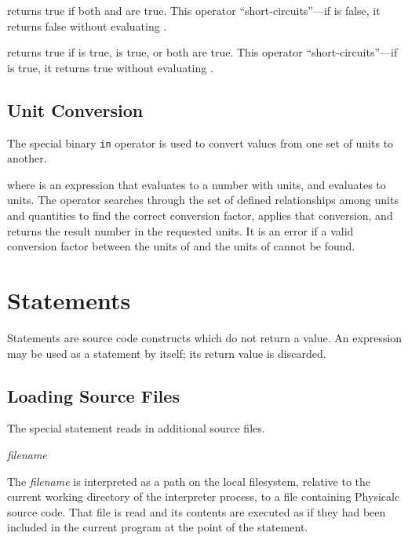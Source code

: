 \begin{syntax}
  
\end{syntax}
returns true if both  and  are true.  This operator
``short-circuits''---if  is false, it returns false without
evaluating .

\begin{syntax}
  
\end{syntax}
returns true if  is true,  is true, or both are true.
This operator ``short-circuits''---if  is true, it returns
true without evaluating .



\subsection{Unit Conversion}
\label{in-op}

The special binary \verb|in| operator is used to convert values from
one set of units to another.  

\begin{syntax}
  
\end{syntax}
where  is an expression that evaluates to a number with units,
and  evaluates to units.  The  operator searches
through the set of defined relationships among units and quantities to
find the correct conversion factor, applies that conversion, and
returns the result number in the requested units.  It is an error if a
valid conversion factor between the units of  and the units of
 cannot be found.





\section{Statements}
\label{statements}

Statements are source code constructs which do not return a value.  An
expression may be used as a statement by itself; its return value is
discarded.


\subsection{Loading Source Files}

The special  statement reads in additional source files.
\begin{syntax}
 \textit{filename}
\end{syntax}
The \textit{filename} is interpreted as a path on the local
filesystem, relative to the current working directory of the
interpreter process, to a file containing Physicalc source code.  That
file is read and its contents are executed as if they had been
included in the current program at the point of the 
statement.

